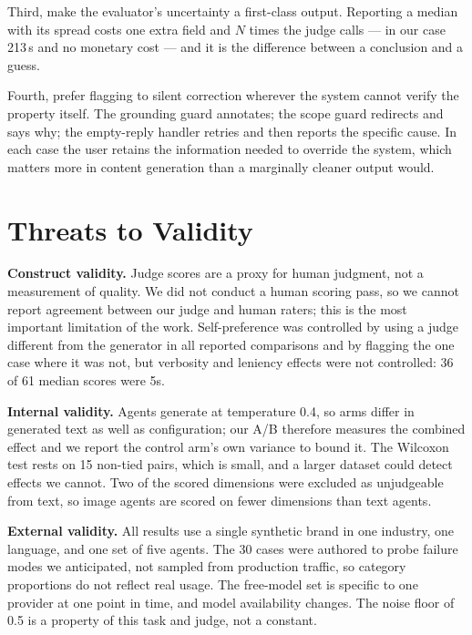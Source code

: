 \documentclass[journal]{IEEEtran}
\begin{document}
Third, make the evaluator's uncertainty a first-class output. Reporting a
median with its spread costs one extra field and $N$ times the judge calls ---
in our case 213\,s and no monetary cost --- and it is the difference between a
conclusion and a guess.

Fourth, prefer flagging to silent correction wherever the system cannot verify
the property itself. The grounding guard annotates; the scope guard redirects
and says why; the empty-reply handler retries and then reports the specific
cause. In each case the user retains the information needed to override the
system, which matters more in content generation than a marginally cleaner
output would.

\section{Threats to Validity}
\label{sec:threats}

\textbf{Construct validity.} Judge scores are a proxy for human judgment, not
a measurement of quality. We did not conduct a human scoring pass, so we cannot
report agreement between our judge and human raters; this is the most important
limitation of the work. Self-preference was controlled by using a judge
different from the generator in all reported comparisons and by flagging the
one case where it was not, but verbosity and leniency effects were not
controlled: 36 of 61 median scores were 5s.

\textbf{Internal validity.} Agents generate at temperature 0.4, so arms differ
in generated text as well as configuration; our A/B therefore measures the
combined effect and we report the control arm's own variance to bound it. The
Wilcoxon test rests on 15 non-tied pairs, which is small, and a larger dataset
could detect effects we cannot. Two of the scored dimensions were excluded as
unjudgeable from text, so image agents are scored on fewer dimensions than
text agents.

\textbf{External validity.} All results use a single synthetic brand in one
industry, one language, and one set of five agents. The 30 cases were authored
to probe failure modes we anticipated, not sampled from production traffic, so
category proportions do not reflect real usage. The free-model set is specific
to one provider at one point in time, and model availability changes. The noise
floor of 0.5 is a property of this task and judge, not a constant.
\end{document}
